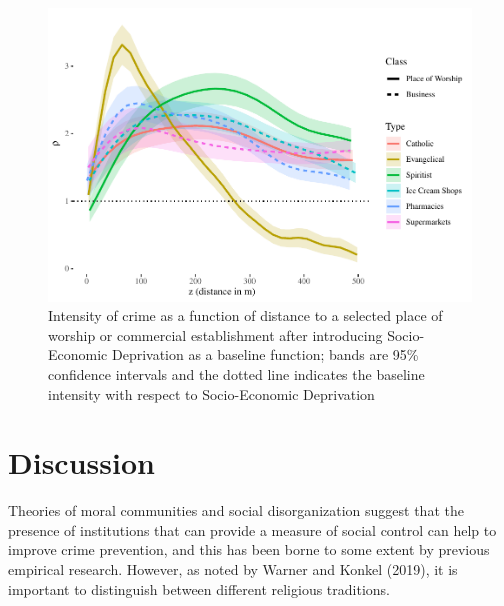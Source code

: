 \documentclass[smallextended]{svjour3}       %
\begin{document}
\begin{figure}
\centering
\includegraphics{Moral_Communities_and_Crime_files/figure-latex/figure-plot-relative-distribution-with-baseline-1.pdf}
\caption{\label{fig:plot-relative-distribution-with-baseline}Intensity
of crime as a function of distance to a selected place of worship or
commercial establishment after introducing Socio-Economic Deprivation as
a baseline function; bands are 95\% confidence intervals and the dotted
line indicates the baseline intensity with respect to Socio-Economic
Deprivation}
\end{figure}

\hypertarget{discussion}{%
\section{Discussion}\label{discussion}}

Theories of moral communities and social disorganization suggest that
the presence of institutions that can provide a measure of social
control can help to improve crime prevention, and this has been borne to
some extent by previous empirical research. However, as noted by Warner
and Konkel (2019), it is important to distinguish between different
religious traditions.
\end{document}
